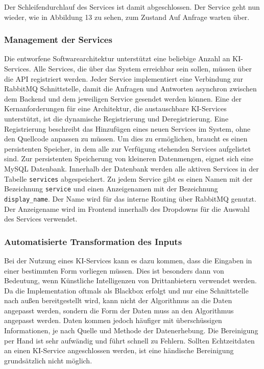 Der Schleifendurchlauf des Services ist damit abgeschlossen. Der Service geht nun wieder, wie in Abbildung 13 zu sehen, zum Zustand \glqq Auf Anfrage warten\grqq{} über. 

\subsubsection{Management der Services}
Die entworfene Softwarearchitektur unterstützt eine beliebige Anzahl an KI-Services. Alle Services, die über das System erreichbar sein sollen, müssen über die API registriert werden. Jeder Service implementiert eine Verbindung zur RabbitMQ Schnittstelle, damit die Anfragen und Antworten asynchron zwischen dem Backend und dem jeweiligen Service gesendet werden können. Eine der Kernanforderungen für eine Architektur, die austauschbare KI-Services unterstützt, ist die dynamische Registrierung und Deregistrierung. Eine Registrierung beschreibt das Hinzufügen eines neuen Services im System, ohne den Quellcode anpassen zu müssen. Um dies zu ermöglichen, braucht es einen persistenten Speicher, in dem alle zur Verfügung stehenden Services aufgelistet sind. Zur persistenten Speicherung von kleineren Datenmengen, eignet sich eine MySQL Datenbank. Innerhalb der Datenbank werden alle aktiven Services in der Tabelle \texttt{services} abgespeichert. Zu jedem Service gibt es einen Namen mit der Bezeichnung \texttt{service} und einen Anzeigenamen mit der Bezeichnung \texttt{display\_{}name}. Der Name wird für das interne Routing über RabbitMQ genutzt. Der Anzeigename wird im Frontend innerhalb des Dropdowns für die Auswahl des Services verwendet.

\subsubsection{Automatisierte Transformation des Inputs}
Bei der Nutzung eines KI-Services kann es dazu kommen, dass die Eingaben in einer bestimmten Form vorliegen müssen. Dies ist besonders dann von Bedeutung, wenn Künstliche Intelligenzen von Drittanbietern verwendet werden. Da die Implementation oftmals als Blackbox erfolgt und nur eine Schnittstelle nach außen bereitgestellt wird, kann nicht der Algorithmus an die Daten angepasst werden, sondern die Form der Daten muss an den Algorithmus angepasst werden. Daten kommen jedoch häufiger mit überschüssigen Informationen, je nach Quelle und Methode der Datenerhebung. Die Bereinigung per Hand ist sehr aufwändig und führt schnell zu Fehlern. Sollten Echtzeitdaten an einen KI-Service angeschlossen werden, ist eine händische Bereinigung grundsätzlich nicht möglich.

